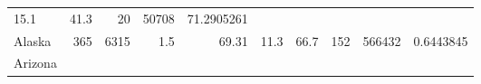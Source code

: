 \documentclass[]{article}
\begin{document}
\begin{longtable}[]{@{}lrrrrrrrrr@{}}
\begin{minipage}[t]{0.05\columnwidth}
15.1\strut
\end{minipage} & \begin{minipage}[t]{0.07\columnwidth}\raggedleft\strut
41.3\strut
\end{minipage} & \begin{minipage}[t]{0.06\columnwidth}\raggedleft\strut
20\strut
\end{minipage} & \begin{minipage}[t]{0.05\columnwidth}\raggedleft\strut
50708\strut
\end{minipage} & \begin{minipage}[t]{0.10\columnwidth}\raggedleft\strut
71.2905261\strut
\end{minipage}\tabularnewline
\begin{minipage}[t]{0.08\columnwidth}\raggedright\strut
Alaska\strut
\end{minipage} & \begin{minipage}[t]{0.08\columnwidth}\raggedleft\strut
365\strut
\end{minipage} & \begin{minipage}[t]{0.07\columnwidth}\raggedleft\strut
6315\strut
\end{minipage} & \begin{minipage}[t]{0.10\columnwidth}\raggedleft\strut
1.5\strut
\end{minipage} & \begin{minipage}[t]{0.07\columnwidth}\raggedleft\strut
69.31\strut
\end{minipage} & \begin{minipage}[t]{0.05\columnwidth}\raggedleft\strut
11.3\strut
\end{minipage} & \begin{minipage}[t]{0.07\columnwidth}\raggedleft\strut
66.7\strut
\end{minipage} & \begin{minipage}[t]{0.06\columnwidth}\raggedleft\strut
152\strut
\end{minipage} & \begin{minipage}[t]{0.05\columnwidth}\raggedleft\strut
566432\strut
\end{minipage} & \begin{minipage}[t]{0.10\columnwidth}\raggedleft\strut
0.6443845\strut
\end{minipage}\tabularnewline
\begin{minipage}[t]{0.08\columnwidth}\raggedright\strut
Arizona\strut
\end{minipage} & \begin{minipage}[t]{0.08\columnwidth}\raggedleft\strut

\end{minipage}
\end{longtable}
\end{document}
